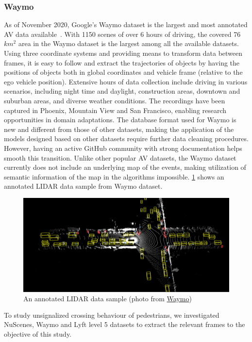 \subsubsection{Waymo}
As of November 2020, Google's Waymo dataset is the largest and most annotated AV data available~\cite{sun2020scalability}. With  1150 scenes of over 6 hours of driving, the covered 76 $km^2$ area in the Waymo dataset is the largest among all the available datasets. Using three coordinate systems and providing means to transform data between frames, it is easy to follow and extract the trajectories of objects by having the positions of objects both in global coordinates and vehicle frame (relative to the ego vehicle position). Extensive hours of data collection include driving in various scenarios, including night time and daylight, construction areas, downtown and suburban areas, and diverse weather conditions. The recordings have been captured in Phoenix, Mountain View and San Francisco, enabling research opportunities in domain adaptations. The database format used for Waymo is new and different from those of other datasets, making the application of the models designed based on other datasets require further data cleaning procedures. However, having an active GitHub community with strong documentation helps smooth this transition. Unlike other popular AV datasets, the Waymo dataset currently does not include an underlying map of the events, making utilization of semantic information of the map in the algorithms impossible.   
\cref{fig:waymo} shows an annotated LIDAR data sample from Waymo dataset.
\begin{figure}
    \centering
    \includegraphics[scale=0.4]{chapter_6/figures/waymo.jpg}
    \caption{An annotated LIDAR data sample (photo from \href{https://waymo.com/open/data/}{Waymo})}
    \label{fig:waymo}
\end{figure}    

To study unsignalized crossing behaviour of pedestrians, we investigated NuScenes, Waymo and Lyft level 5 datasets to extract the relevant frames to the objective of this study.

